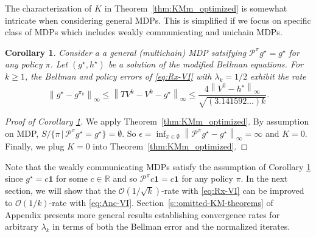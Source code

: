 \documentclass{article} %
\newcommand{\cP}{\mathcal{P}}
\newcommand*{\infn}[1]{\left\|{#1}\right\|_{\infty}}
\newtheorem{corollary}{Corollary}
\begin{document}
The characterization of $K$ in Theorem~\ref{thm:KMm_optimized} is somewhat intricate when considering general MDPs. This is simplified if we focus on specific class of MDPs which includes weakly communicating and unichain MDPs.
\begin{corollary}\label{cor::KM_bellman_com}
Consider a a general (multichain) MDP satsifying $\cP^{\pi}g^{\star}=g^{\star}$ for any policy $\pi$.
Let $(g^{\star},h^{\star})$ be a solution of the modified Bellman equations. For $k\ge 1$, the Bellman and policy errors of \ref{eq:Rx-VI} with $\lambda_k=1/2$ exhibit the rate
        \[\infn{g^{\star}-g^{\pi_k}} \le \infn{TV^k-V^k-g^{\star}} \le \frac{4\infn{V^0-h^{\star}}}{\sqrt{(3.141592\dots) k}}.\]
\end{corollary}
\begin{proof}[Proof of Corollary \ref{cor::KM_bellman_com}]
We apply Theorem~\ref{thm:KMm_optimized}. By assumption on MDP, $ S / \{\pi \,|\,\cP^{\pi}g^{\star} =  g^{\star}\} = \emptyset$. So $\epsilon=\inf_{\pi \in \emptyset} \infn{\cP^{\pi}g^{\star}-g^{\star}} = \infty$ and $K=0$. Finally, we plug $K=0$ into Theorem~\ref{thm:KMm_optimized}.
\end{proof}
Note that the weakly communicating MDPs satisfy the assumption of Corollary \ref{cor::KM_bellman_com} since  $g^{\star}=c\mathbf{1}$ for some $c \in \mathbb{R}$ \cite[Theorem~8.3.2]{10.5555/528623} and so $\cP^{\pi}c\mathbf{1} =  c\mathbf{1}$ for any policy $\pi$. 
In the next section, we will show that the $\mathcal{O}(1/\sqrt{k})$-rate with \ref{eq:Rx-VI} can be improved to $\mathcal{O}(1/k)$-rate with \ref{eq:Anc-VI}.
Section~\ref{s::omitted-KM-theorems} of Appendix presents more general results establishing convergence rates for arbitrary $\lambda_k$ in terms of both the Bellman error and the normalized iterates.
\end{document}
